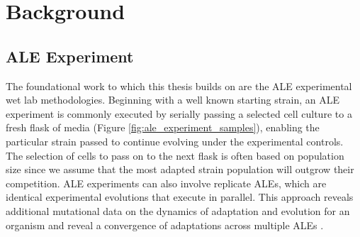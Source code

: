 \documentclass[12pt,final,masters,chapterheads]{ucsd}  %
\begin{document}
%
%

%
%

\section{Background}
\subsection{ALE Experiment}

%
%

%
%

The foundational work to which this thesis builds on are the ALE experimental wet lab methodologies. Beginning with a well known starting strain, an ALE experiment is commonly executed by serially passing a selected cell culture to a fresh flask of media (Figure \ref{fig:ale_experiment_samples}), enabling the particular strain passed to continue evolving under the experimental controls. The selection of cells to pass on to the next flask is often based on population size since we assume that the most adapted strain population will outgrow their competition. ALE experiments can also involve replicate ALEs, which are identical experimental evolutions that execute in parallel. This approach reveals additional mutational data on the dynamics of adaptation and evolution for an organism and reveal a convergence of adaptations across multiple ALEs \cite{sys_bio_book}.
\end{document}

